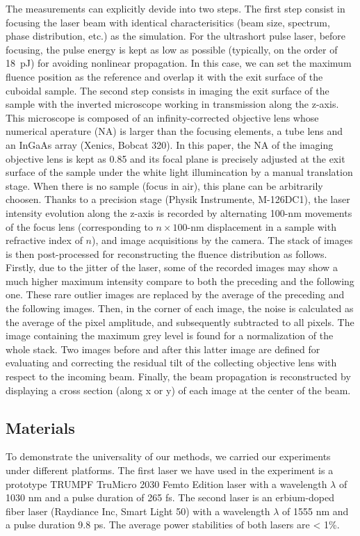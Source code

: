 \documentclass[9pt,twocolumn,twoside]{osajnl}
\begin{document}
The measurements can explicitly devide into two steps. The first step consist in focusing the laser beam with identical characterisitics (beam size, spectrum, phase distribution, etc.) as the simulation. For the ultrashort pulse laser, before focusing, the pulse energy is kept as low as possible (typically, on the order of 18~pJ) for avoiding nonlinear propagation. In this case, we can set the maximum fluence position as the reference and overlap it with the exit surface of the cuboidal sample. The second step consists in imaging the exit surface of the sample with the inverted microscope working in transmission along the z-axis. This microscope is composed of an infinity-corrected objective lens whose numerical aperature (NA) is larger than the focusing elements, a tube lens and an InGaAs array (Xenics, Bobcat 320). In this paper, the NA of the imaging objective lens is kept as 0.85 and its focal plane is precisely adjusted at the exit surface of the sample under the white light illumincation by a manual translation stage. When there is no sample (focus in air), this plane can be arbitrarily choosen. Thanks to a precision stage (Physik Instrumente, M-126DC1), the laser intensity evolution along the z-axis is recorded by alternating 100-nm movements of the focus lens (corresponding to $n\times100$-nm displacement in a sample with refractive index of $n$), and image acquisitions by the camera. The stack of images is then post-processed for reconstructing the fluence distribution as follows. Firstly, due to the jitter of the laser, some of the recorded images may show a much higher maximum intensity compare to both the preceding and the following one. These rare outlier images are replaced by the average of the preceding and the following images. Then, in the corner of each image, the noise is calculated as the average of the pixel amplitude, and subsequently subtracted to all pixels. The image containing the maximum grey level is found for a normalization of the whole stack. Two images before and after this latter image are defined for evaluating and correcting the residual tilt of the collecting objective lens with respect to the incoming beam. Finally, the beam propagation is reconstructed by displaying a cross section (along x or y) of each image at the center of the beam. 

\subsection{Materials}
To demonstrate the universality of our methods, we carried our experiments under different platforms. The first laser we have used in the experiment is a prototype TRUMPF TruMicro 2030 Femto Edition laser with a wavelength $\lambda$ of 1030 nm and a pulse duration of 265 fs. The second laser is an erbium-doped fiber laser (Raydiance Inc, Smart Light 50) with a wavelength $\lambda$ of 1555 nm and a pulse duration 9.8 ps. The average power stabilities of both lasers are < 1\%.
\end{document}
